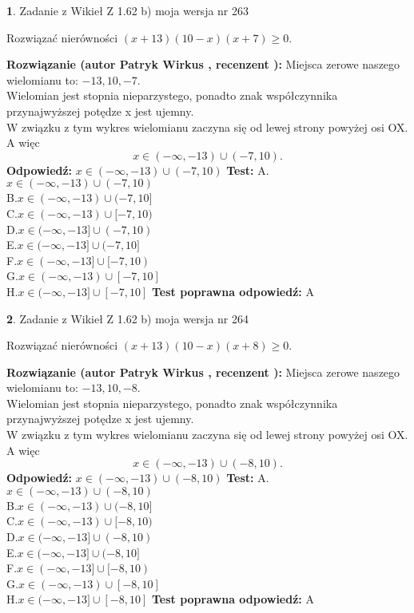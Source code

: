 \documentclass[12pt, a4paper]{article}
\theoremstyle{definition} %
\newtheorem{zad}{}
\newcommand{\zadStart}[1]{\begin{zad}#1\newline}
\newcommand{\zadStop}{\end{zad}}
\newcommand{\rozwStart}[2]{\noindent \textbf{Rozwiązanie (autor #1 , recenzent #2): }\newline}
\newcommand{\rozwStop}{\newline}
\newcommand{\odpStart}{\noindent \textbf{Odpowiedź:}\newline}
\newcommand{\odpStop}{\newline}
\newcommand{\testStart}{\noindent \textbf{Test:}\newline}
\newcommand{\testStop}{\newline}
\newcommand{\kluczStart}{\noindent \textbf{Test poprawna odpowiedź:}\newline}
\newcommand{\kluczStop}{\newline}
\begin{document}
\zadStart{Zadanie z Wikieł Z 1.62 b) moja wersja nr 263}

Rozwiązać nierówności $(x+13)(10-x)(x+7)\ge0$.
\zadStop
\rozwStart{Patryk Wirkus}{}
Miejsca zerowe naszego wielomianu to: $-13, 10, -7$.\\
Wielomian jest stopnia nieparzystego, ponadto znak współczynnika przy\linebreak najwyższej potędze x jest ujemny.\\ W związku z tym wykres wielomianu zaczyna się od lewej strony powyżej osi OX. A więc $$x \in (-\infty,-13) \cup (-7,10).$$
\rozwStop
\odpStart
$x \in (-\infty,-13) \cup (-7,10)$
\odpStop
\testStart
A.$x \in (-\infty,-13) \cup (-7,10)$\\
B.$x \in (-\infty,-13) \cup (-7,10]$\\
C.$x \in (-\infty,-13) \cup [-7,10)$\\
D.$x \in (-\infty,-13] \cup (-7,10)$\\
E.$x \in (-\infty,-13] \cup (-7,10]$\\
F.$x \in (-\infty,-13] \cup [-7,10)$\\
G.$x \in (-\infty,-13) \cup [-7,10]$\\
H.$x \in (-\infty,-13] \cup [-7,10]$
\testStop
\kluczStart
A
\kluczStop



\zadStart{Zadanie z Wikieł Z 1.62 b) moja wersja nr 264}

Rozwiązać nierówności $(x+13)(10-x)(x+8)\ge0$.
\zadStop
\rozwStart{Patryk Wirkus}{}
Miejsca zerowe naszego wielomianu to: $-13, 10, -8$.\\
Wielomian jest stopnia nieparzystego, ponadto znak współczynnika przy\linebreak najwyższej potędze x jest ujemny.\\ W związku z tym wykres wielomianu zaczyna się od lewej strony powyżej osi OX. A więc $$x \in (-\infty,-13) \cup (-8,10).$$
\rozwStop
\odpStart
$x \in (-\infty,-13) \cup (-8,10)$
\odpStop
\testStart
A.$x \in (-\infty,-13) \cup (-8,10)$\\
B.$x \in (-\infty,-13) \cup (-8,10]$\\
C.$x \in (-\infty,-13) \cup [-8,10)$\\
D.$x \in (-\infty,-13] \cup (-8,10)$\\
E.$x \in (-\infty,-13] \cup (-8,10]$\\
F.$x \in (-\infty,-13] \cup [-8,10)$\\
G.$x \in (-\infty,-13) \cup [-8,10]$\\
H.$x \in (-\infty,-13] \cup [-8,10]$
\testStop
\kluczStart
A
\kluczStop
\end{document}
